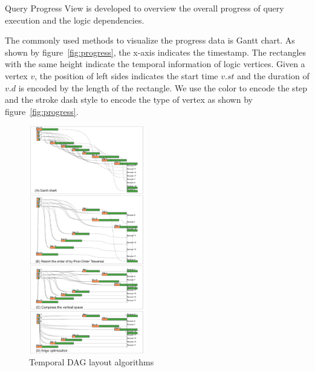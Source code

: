 Query Progress View is developed to overview the overall progress of query execution and the logic dependencies. 


The commonly used methods to visualize the progress data is Gantt chart.
As shown by figure~\ref{fig:progress}, the x-axis indicates the timestamp. The rectangles with the same  height indicate the temporal information of logic vertices. Given a vertex $v$, the position of left sides indicates the start time $v.st$ and the duration of $v.d$ is encoded by the length of the rectangle. We use the color to encode the step and the stroke dash style to encode the type of vertex as shown by figure~\ref{fig:progress}.


\begin{figure}[t]
	\centering
	\includegraphics[width=0.45\textwidth]{figures/visualization/exeprogress.pdf}
	\vspace{-3mm}
	\caption{Temporal DAG layout algorithms}
	\label{fig:layout}
	\vspace{-3mm}
\end{figure}

